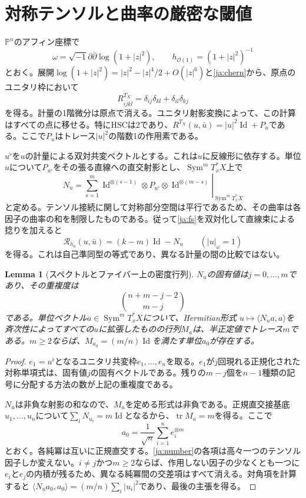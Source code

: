 \documentclass[12pt]{amsart}
\newtheorem{lem}[thm]{Lemma}
\theoremstyle{definition}
\theoremstyle{remark}
\numberwithin{equation}{section}
\DeclareMathOperator{\tr}{tr}
\DeclareMathOperator{\Id}{Id}
\DeclareMathOperator{\Sym}{Sym}
\newcommand{\Pp}{\mathbb P}
\newcommand{\ddc}{\sqrt{-1}\partial\bar\partial}
\newcommand{\jref}[1]{\eqref{ja:#1}}
\begin{document}
\section{対称テンソルと曲率の厳密な閾値}

$\Pp^n$のアフィン座標で
\[
\omega=\ddc\log(1+|z|^2),\qquad
h_{\mathcal O(1)}=(1+|z|^2)^{-1}
\]
とおく。展開$\log(1+|z|^2)=|z|^2-|z|^4/2+O(|z|^6)$と\jref{chern}から、原点のユニタリ枠において
\begin{equation}\label{ja:fs}
R^{T_X}_{i\bar jk\bar l}
=\delta_{ij}\delta_{kl}+\delta_{il}\delta_{kj}
\end{equation}
を得る。計量の1階微分は原点で消える。ユニタリ射影変換によって、この計算はすべての点に移せる。特にHSCは$2$であり、$R^{T_X}(u,\bar u)=|u|^2\Id+P_u$である。ここで$P_u$はトレース$|u|^2$の階数1の作用素である。

$u^\flat$を$u$の計量による双対共変ベクトルとする。これは$u$に反線形に依存する。単位$u$について$P_{u^\flat}$をその張る直線への直交射影とし、$\Sym^m T_x^*X$上で
\begin{equation}\label{ja:number}
N_u=\left.\sum_{s=1}^m
\Id^{\otimes(s-1)}\otimes P_{u^\flat}\otimes\Id^{\otimes(m-s)}
\right|_{\Sym^m T_x^*X}
\end{equation}
と定める。テンソル接続に関して対称部分空間は平行であるため、その曲率は各因子の曲率の和を制限したものである。従って\jref{fs}を双対化して直線束による捻りを加えると
\begin{equation}\label{ja:operator}
\mathcal R_{h_0}(u,\bar u)=(k-m)\Id-N_u\qquad (|u|_\omega=1)
\end{equation}
を得る。これは自己準同型の等式であり、異なる計量の間の比較ではない。

\begin{lem}[スペクトルとファイバー上の密度行列]\label{ja:density}
$N_u$の固有値は$j=0,\ldots,m$であり、その重複度は
\[
\binom{n+m-j-2}{m-j}
\]
である。単位ベクトル$a\in\Sym^m T_x^*X$について、Hermitian形式
$u\mapsto\langle N_u a,a\rangle$を斉次性によってすべての$u$に拡張したものの行列$M_a$は、半正定値でトレース$m$である。$m\ge2$ならば、$M_{a_0}=(m/n)\Id$を満たす単位$a_0$が存在する。
\end{lem}

\begin{proof}
$e_1=u^\flat$となるユニタリ共変枠$e_1,\ldots,e_n$を取る。$e_1$が$j$回現れる正規化された対称単項式は、固有値$j$の固有ベクトルである。残りの$m-j$個を$n-1$種類の記号に分配する方法の数が上記の重複度である。

$N_u$は非負な射影の和なので、$M_a$を定める形式は非負である。正規直交接基底$u_1,\ldots,u_n$について$\sum_iN_{u_i}=m\Id$となるから、$\tr M_a=m$を得る。ここで
\begin{equation}\label{ja:balanced}
a_0=\frac1{\sqrt n}\sum_{i=1}^n e_i^{\otimes m}
\end{equation}
とおく。各純冪は互いに正規直交する。\jref{number}の各項は高々一つのテンソル因子しか変えない。$i\ne j$かつ$m\ge2$ならば、作用しない因子の少なくとも一つに$e_i$と$e_j$の内積が残るため、異なる純冪間の交差項はすべて消える。対角項を計算すると
$\langle N_u a_0,a_0\rangle=(m/n)\sum_i|u_i|^2$であり、最後の主張を得る。
\end{proof}
\end{document}
